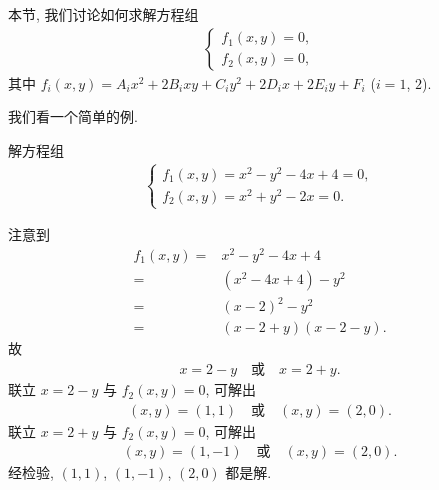 \documentclass[%
    UTF8,%
    fontset=none,%
    punct=kaiming,%
    zihao=-4,%
    a4paper,%
    oneside,%
]{ctexbook}
\begin{document}
本节, 我们讨论如何求解方程组
\begin{align}
    \begin{cases}
        f_1 (x, y) = 0, \\
        f_2 (x, y) = 0,
    \end{cases}
    \label{eq:A0301}
\end{align}
其中 \(f_i (x, y) = A_i x^2 + 2B_i xy + C_i y^2
+ 2D_i x + 2E_i y + F_i\)
(\(i = 1\), \(2\)).

我们看一个简单的例.

\begin{example}
    解方程组
    \begin{align*}
        \begin{cases}
            f_1 (x, y) = x^2 - y^2 - 4x + 4 = 0, \\
            f_2 (x, y) = x^2 + y^2 - 2x = 0.
        \end{cases}
    \end{align*}

    注意到
    \begin{align*}
        f_1 (x, y)
        = {} & x^2 - y^2 - 4x + 4      \\
        = {} & (x^2 - 4x + 4) - y^2    \\
        = {} & (x - 2)^2 - y^2         \\
        = {} & (x - 2 + y)(x - 2 - y).
    \end{align*}
    故
    \begin{align*}
        x = 2 - y
        \quad \text{或} \quad
        x = 2 + y.
    \end{align*}
    联立 \(x = 2 - y\) 与 \(f_2 (x, y) = 0\),
    可解出
    \begin{align*}
        (x, y) = (1, 1)
        \quad \text{或} \quad
        (x, y) = (2, 0).
    \end{align*}
    联立 \(x = 2 + y\) 与 \(f_2 (x, y) = 0\),
    可解出
    \begin{align*}
        (x, y) = (1, -1)
        \quad \text{或} \quad
        (x, y) = (2, 0).
    \end{align*}
    经检验, \((1, 1)\), \((1, -1)\), \((2, 0)\) 都是解.


\end{example}
\end{document}
